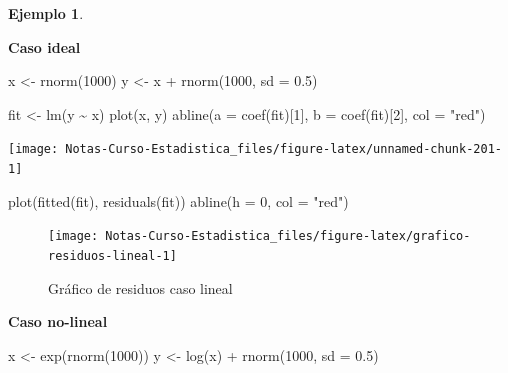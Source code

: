 \documentclass[
  12pt,
]{book}
\newenvironment{Shaded}{\begin{snugshade}}{\end{snugshade}}
\newcommand{\AttributeTok}[1]{\textcolor[rgb]{0.77,0.63,0.00}{#1}}
\newcommand{\DecValTok}[1]{\textcolor[rgb]{0.00,0.00,0.81}{#1}}
\newcommand{\FloatTok}[1]{\textcolor[rgb]{0.00,0.00,0.81}{#1}}
\newcommand{\FunctionTok}[1]{\textcolor[rgb]{0.00,0.00,0.00}{#1}}
\newcommand{\NormalTok}[1]{#1}
\newcommand{\OtherTok}[1]{\textcolor[rgb]{0.56,0.35,0.01}{#1}}
\newcommand{\SpecialCharTok}[1]{\textcolor[rgb]{0.00,0.00,0.00}{#1}}
\newcommand{\StringTok}[1]{\textcolor[rgb]{0.31,0.60,0.02}{#1}}
\theoremstyle{definition}
\theoremstyle{definition}
\newtheorem{example}{Ejemplo}[chapter]
\theoremstyle{definition}
\theoremstyle{remark}
\begin{document}
\begin{example}
\protect\hypertarget{exm:unlabeled-div-49}{}\label{exm:unlabeled-div-49}

\textbf{Caso ideal}

\begin{Shaded}
\begin{Highlighting}[]
\NormalTok{x }\OtherTok{\textless{}{-}} \FunctionTok{rnorm}\NormalTok{(}\DecValTok{1000}\NormalTok{)}
\NormalTok{y }\OtherTok{\textless{}{-}}\NormalTok{ x }\SpecialCharTok{+} \FunctionTok{rnorm}\NormalTok{(}\DecValTok{1000}\NormalTok{, }\AttributeTok{sd =} \FloatTok{0.5}\NormalTok{)}

\NormalTok{fit }\OtherTok{\textless{}{-}} \FunctionTok{lm}\NormalTok{(y }\SpecialCharTok{\textasciitilde{}}\NormalTok{ x)}
\FunctionTok{plot}\NormalTok{(x, y)}
\FunctionTok{abline}\NormalTok{(}\AttributeTok{a =} \FunctionTok{coef}\NormalTok{(fit)[}\DecValTok{1}\NormalTok{], }\AttributeTok{b =} \FunctionTok{coef}\NormalTok{(fit)[}\DecValTok{2}\NormalTok{], }\AttributeTok{col =} \StringTok{"red"}\NormalTok{)}
\end{Highlighting}
\end{Shaded}

\begin{center}\texttt{[image: Notas-Curso-Estadistica\_files/figure-latex/unnamed-chunk-201-1]} \end{center}

\begin{Shaded}
\begin{Highlighting}[]
\FunctionTok{plot}\NormalTok{(}\FunctionTok{fitted}\NormalTok{(fit), }\FunctionTok{residuals}\NormalTok{(fit))}
\FunctionTok{abline}\NormalTok{(}\AttributeTok{h =} \DecValTok{0}\NormalTok{, }\AttributeTok{col =} \StringTok{"red"}\NormalTok{)}
\end{Highlighting}
\end{Shaded}

\begin{figure}

{\centering \texttt{[image: Notas-Curso-Estadistica\_files/figure-latex/grafico-residuos-lineal-1]} 

}

\caption{Gráfico de residuos caso lineal}\label{fig:grafico-residuos-lineal}
\end{figure}

\textbf{Caso no-lineal}

\begin{Shaded}
\begin{Highlighting}[]
\NormalTok{x }\OtherTok{\textless{}{-}} \FunctionTok{exp}\NormalTok{(}\FunctionTok{rnorm}\NormalTok{(}\DecValTok{1000}\NormalTok{))}
\NormalTok{y }\OtherTok{\textless{}{-}} \FunctionTok{log}\NormalTok{(x) }\SpecialCharTok{+} \FunctionTok{rnorm}\NormalTok{(}\DecValTok{1000}\NormalTok{, }\AttributeTok{sd =} \FloatTok{0.5}\NormalTok{)}


\end{Highlighting}
\end{Shaded}
\end{example}
\end{document}
